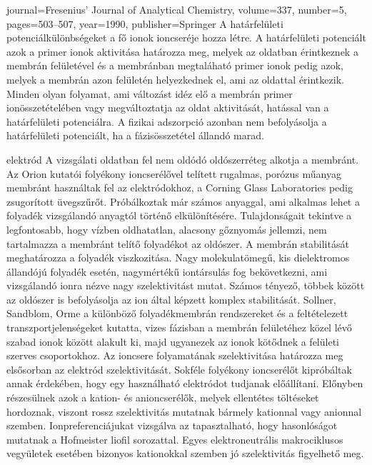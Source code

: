{{  journal={Fresenius' Journal of Analytical Chemistry},
  volume={337},
  number={5},
  pages={503--507},
  year={1990},
  publisher={Springer}
}A határfelületi potenciálkülönbségeket a fő ionok ioncseréje hozza létre. A határfelületi potenciált azok a primer ionok aktivitása határozza meg, melyek az oldatban érintkeznek a membrán felületével és a membránban megtaláható primer ionok pedig azok, melyek a membrán azon felületén helyezkednek el, ami az oldattal érintkezik. Minden olyan folyamat, ami változást idéz elő a membrán primer ionösszetételében vagy megváltoztatja az oldat aktivitását, hatással van a határfelületi potenciálra. A fizikai adszorpció azonban nem befolyásolja a határfelületi potenciált, ha a fázisösszetétel állandó marad.


 elektród
A vizsgálati oldatban fel nem oldódó oldószerréteg alkotja a membránt. Az Orion kutatói folyékony ioncserélővel telített rugalmas, porózus műanyag membránt használtak fel az elektródokhoz, a Corning Glass Laboratories pedig zsugorított üvegszűrőt. Próbálkoztak már számos anyaggal, ami alkalmas lehet a folyadék vizsgálandó anyagtól történő elkülönítésére. Tulajdonságait tekintve a legfontosabb, hogy vízben oldhatatlan, alacsony gőznyomás jellemzi, nem tartalmazza a membránt telítő folyadékot az oldószer. A membrán stabilitását meghatározza a folyadék viszkozitása. Nagy molekulatömegű, kis dielektromos állandójú folyadék esetén, nagymértékű iontársulás fog bekövetkezni, ami vizsgálandó ionra nézve nagy szelektivitást mutat. Számos tényező, többek között az oldószer is befolyásolja az ion által képzett komplex stabilitását. Sollner, Sandblom, Orme a különböző folyadékmembrán rendszereket és a feltételezett transzportjelenségeket kutatta, vizes fázisban a membrán felületéhez közel lévő szabad ionok között alakult ki, majd ugyanezek az ionok kötődnek a felületi szerves csoportokhoz. Az ioncsere folyamatának szelektivitása határozza meg elsősorban az elektród szelektivitását. Sokféle folyékony ioncserélőt kipróbáltak annak érdekében, hogy egy használható elektródot tudjanak előállítani. Előnyben részesülnek azok a kation- és anioncserélők, melyek ellentétes töltéseket hordoznak, viszont rossz szelektivitás mutatnak bármely kationnal vagy anionnal szemben. Ionpreferenciájukat vizsgálva az tapasztalható, hogy hasonlóságot mutatnak a Hofmeister liofil sorozattal. Egyes elektroneutrális makrociklusos vegyületek esetében bizonyos kationokkal szemben jó szelektivitás figyelhető meg. 

}
